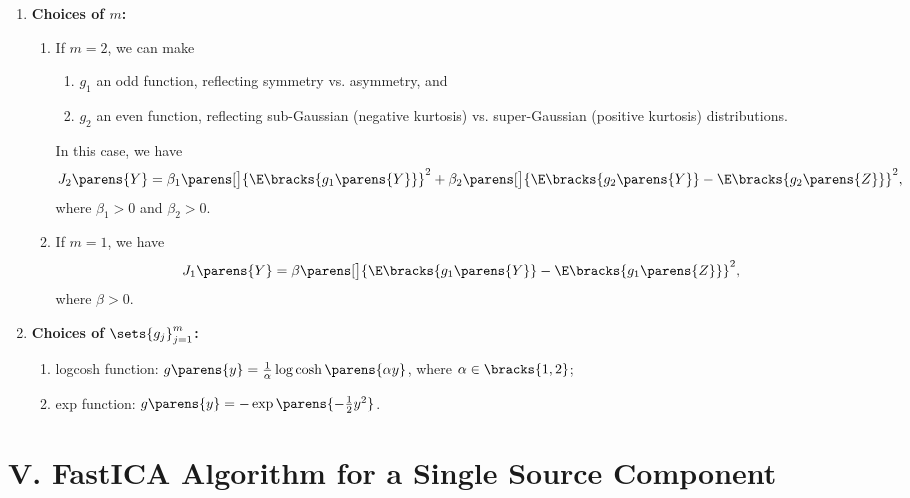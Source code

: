 \documentclass[12pt]{article}
\begin{document}
\begin{enumerate}[label=\textbf{\arabic*.}]
	\item \textbf{Choices of $m$:}  
	\begin{enumerate}
		\item If $m=2$, we can make 
		\begin{enumerate}
			\item $g_1$ an odd function, reflecting symmetry vs. asymmetry, and 
			\item $g_2$ an even function, reflecting sub-Gaussian (negative kurtosis) vs. super-Gaussian (positive kurtosis) distributions. 
		\end{enumerate}
		In this case, we have 
		\begin{align}\label{eq-obj-2}
			J_2 \parens{Y} = \beta_1 \parens[\big]{\E \bracks{g_1 \parens{Y}}}^2 + \beta_2 \parens[\big]{\E \bracks{g_2 \parens{Y}} - \E \bracks{g_2 \parens{Z}}}^2, 
		\end{align}
		where $\beta_1 > 0$ and $\beta_2 > 0$. 
		
		\item If $m = 1$, we have 
		\begin{align}\label{eq-obj-1}
			J_1 \parens{Y} = \beta \parens[\big]{\E \bracks{g_1 \parens{Y}} - \E \bracks{g_1 \parens{Z}}}^2, 
		\end{align}
		where $\beta > 0$. 
	\end{enumerate}
	
	\item \textbf{Choices of $\sets{g_j}_{j=1}^m$:}
	\begin{enumerate}
		\item logcosh function: $g \parens{y} = \frac{1}{\alpha} \log \cosh \parens{\alpha y}$, where $\alpha \in \bracks{1, 2}$; 
		\item exp function: $g \parens{y} = - \exp \parens{- \frac{1}{2} y^2}$. 
	\end{enumerate}	

\end{enumerate}


\section*{V. FastICA Algorithm for a Single Source Component}
\end{document}
